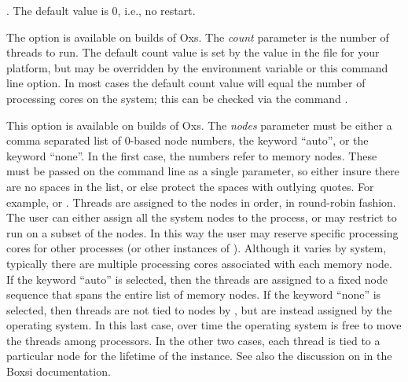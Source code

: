 \begin{description}
  .
  The default value is 0, i.e., no restart.
\item[\optkey{-threads \boa count\bca}]
  The option is available on
   builds of Oxs.
  The \textit{count} parameter is the number of threads to run.  The
  default count value is set by the  value in
  the  file for your platform, but may be
  overridden by the
  environment variable or this command line option.  In most cases the
  default count value will equal the number of processing cores on the
  system; this can be checked via the command
  .
\item[\optkey{-numanodes \boa nodes\bca}]
  This option is available on
   builds of
  Oxs.  The \textit{nodes} parameter must be either a comma separated
  list of 0-based node numbers, the keyword ``auto'', or the keyword
  ``none''.  In the first case, the numbers refer to memory nodes.
  These must be passed on the command line as a single parameter, so
  either insure there are no spaces in the list, or else protect the
  spaces with outlying quotes.  For example,  or
  .  Threads are assigned to the nodes in
  order, in round-robin fashion.  The user can either assign all the
  system nodes to the  process, or may restrict 
  to run on a subset of the nodes.  In this way the user may reserve
  specific processing cores for other processes (or other instances of
  ).  Although it varies by system, typically there are
  multiple processing cores associated with each memory node.  If the
  keyword ``auto'' is selected, then the threads are assigned to a
  fixed node sequence that spans the entire list of memory nodes.  If
  the keyword ``none'' is selected, then threads are not tied to nodes
  by , but are instead assigned by the operating system.
  In this last case, over time the operating system is free to move
  the threads among processors.  In the other two cases, each thread
  is tied to a particular node for the lifetime of the 
   instance.  See also the discussion on  in the Boxsi documentation.


\end{description}
